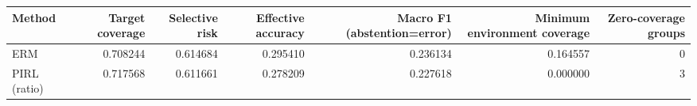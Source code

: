 \begin{tabular}{lrrrrrr}
\toprule
Method & Target coverage & Selective risk & Effective accuracy & Macro F1 (abstention=error) & Minimum environment coverage & Zero-coverage groups \\
\midrule
ERM & 0.708244 & 0.614684 & 0.295410 & 0.236134 & 0.164557 & 0 \\
PIRL (ratio) & 0.717568 & 0.611661 & 0.278209 & 0.227618 & 0.000000 & 3 \\
\bottomrule
\end{tabular}

